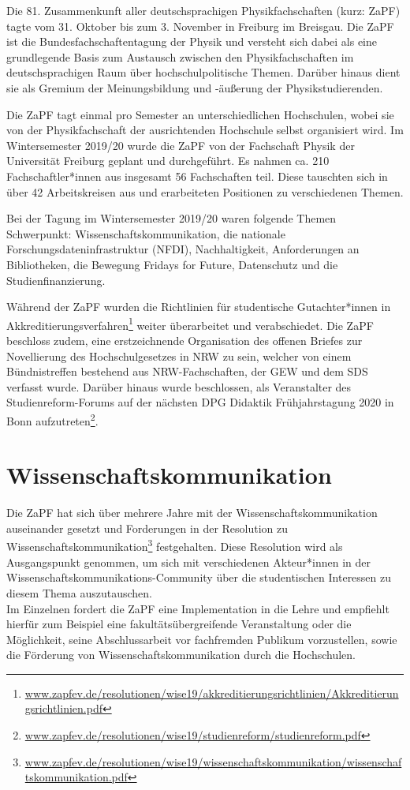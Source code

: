 Die 81. Zusammenkunft aller deutschsprachigen Physikfachschaften (kurz: ZaPF) tagte vom 31. Oktober bis zum 3. November in Freiburg im Breisgau. Die ZaPF ist die Bundesfachschaftentagung der Physik und versteht sich dabei als eine grundlegende Basis zum Austausch zwischen den Physikfachschaften im deutschsprachigen Raum über hochschulpolitische Themen. Darüber hinaus dient sie als Gremium der Meinungsbildung und -äußerung der Physikstudierenden.

Die ZaPF tagt einmal pro Semester an unterschiedlichen Hochschulen, wobei sie von der Physikfachschaft der ausrichtenden Hochschule selbst organisiert wird. 
Im Wintersemester 2019/20 wurde die ZaPF von der Fachschaft Physik der Universität Freiburg geplant und durchgeführt.  
Es nahmen ca. 210 Fachschaftler*innen aus insgesamt 56 Fachschaften teil.
Diese tauschten sich in über 42 Arbeitskreisen aus und erarbeiteten Positionen zu verschiedenen Themen.

Bei der Tagung im Wintersemester 2019/20 waren folgende Themen Schwerpunkt: Wissenschaftskommunikation, die nationale Forschungsdateninfrastruktur (NFDI), Nachhaltigkeit, Anforderungen an Bibliotheken, die Bewegung Fridays for Future, Datenschutz und die Studienfinanzierung. 

Während der ZaPF wurden die Richtlinien für studentische Gutachter*innen in Akkreditierungsverfahren\footnote{\url{www.zapfev.de/resolutionen/wise19/akkreditierungsrichtlinien/Akkreditierungsrichtlinien.pdf}} weiter überarbeitet und verabschiedet. Die ZaPF beschloss zudem, eine erstzeichnende Organisation des offenen Briefes zur Novellierung des Hochschulgesetzes in NRW zu sein, welcher von einem Bündnistreffen bestehend aus NRW-Fachschaften, der GEW und dem SDS verfasst wurde. Darüber hinaus wurde beschlossen, als Veranstalter des Studienreform-Forums auf der nächsten DPG Didaktik Frühjahrstagung 2020 in Bonn aufzutreten\footnote{\url{www.zapfev.de/resolutionen/wise19/studienreform/studienreform.pdf}}.

\section*{Wissenschaftskommunikation}
Die ZaPF hat sich über mehrere Jahre mit der Wissenschaftskommunikation auseinander gesetzt und Forderungen in der Resolution zu Wissenschaftskommunikation\footnote{\url{www.zapfev.de/resolutionen/wise19/wissenschaftskommunikation/wissenschaftskommunikation.pdf}} festgehalten. Diese Resolution wird als Ausgangspunkt genommen, um sich mit verschiedenen Akteur*innen in der Wissenschaftskommunikations-Community über die studentischen Interessen zu diesem Thema auszutauschen.\\
Im Einzelnen fordert die ZaPF eine Implementation in die Lehre und empfiehlt hierfür zum Beispiel eine fakultätsübergreifende Veranstaltung oder die Möglichkeit, seine Abschlussarbeit vor fachfremden Publikum vorzustellen, sowie die Förderung von Wissenschaftskommunikation durch die Hochschulen.

